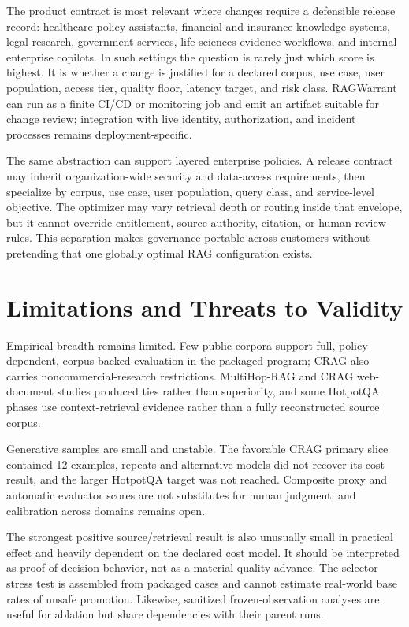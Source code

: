 \documentclass[11pt]{article}
\begin{document}
The product contract is most relevant where changes require a defensible
release record: healthcare policy assistants, financial and insurance
knowledge systems, legal research, government services, life-sciences
evidence workflows, and internal enterprise copilots. In such settings
the question is rarely just which score is highest. It is whether a
change is justified for a declared corpus, use case, user population,
access tier, quality floor, latency target, and risk class. RAGWarrant
can run as a finite CI/CD or monitoring job and emit an artifact
suitable for change review; integration with live identity,
authorization, and incident processes remains deployment-specific.

The same abstraction can support layered enterprise policies. A release
contract may inherit organization-wide security and data-access
requirements, then specialize by corpus, use case, user population,
query class, and service-level objective. The optimizer may vary
retrieval depth or routing inside that envelope, but it cannot override
entitlement, source-authority, citation, or human-review rules. This
separation makes governance portable across customers without pretending
that one globally optimal RAG configuration exists.

\section{Limitations and Threats to Validity}\label{sec:limitations}

Empirical breadth remains limited. Few public corpora support full,
policy-dependent, corpus-backed evaluation in the packaged program; CRAG
also carries noncommercial-research restrictions. MultiHop-RAG and CRAG
web-document studies produced ties rather than superiority, and some
HotpotQA phases use context-retrieval evidence rather than a fully
reconstructed source corpus.

Generative samples are small and unstable. The favorable CRAG primary
slice contained 12 examples, repeats and alternative models did not
recover its cost result, and the larger HotpotQA target was not reached.
Composite proxy and automatic evaluator scores are not substitutes for
human judgment, and calibration across domains remains open.

The strongest positive source/retrieval result is also unusually small
in practical effect and heavily dependent on the declared cost model. It
should be interpreted as proof of decision behavior, not as a material
quality advance. The selector stress test is assembled from packaged
cases and cannot estimate real-world base rates of unsafe promotion.
Likewise, sanitized frozen-observation analyses are useful for ablation
but share dependencies with their parent runs.
\end{document}
